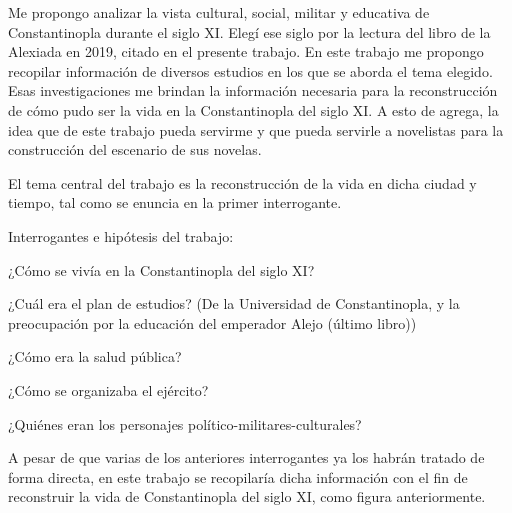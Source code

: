 


Me propongo analizar la vista cultural, social, militar y educativa de
Constantinopla durante el siglo XI. Elegí ese siglo por
la lectura del libro de la Alexiada en 2019, citado en el
presente trabajo.
En este trabajo me propongo recopilar información de diversos
estudios en los que se aborda el tema elegido.
Esas investigaciones me brindan la información necesaria para la
reconstrucción de cómo pudo ser la vida en la Constantinopla
del siglo XI. 
A esto de agrega, la idea que de este trabajo pueda servirme
y que pueda servirle a novelistas para la construcción del escenario
de sus novelas.

El tema central del trabajo es la reconstrucción de la vida
en dicha ciudad y tiempo, tal como se enuncia en la primer
interrogante.

Interrogantes e hipótesis del trabajo:

¿Cómo se vivía en la Constantinopla del siglo XI?

¿Cuál era el plan de estudios?
(De la Universidad de Constantinopla, y la preocupación
por la educación del emperador Alejo (último libro))

¿Cómo era la salud pública?

¿Cómo se organizaba el ejército?

¿Quiénes eran los personajes político-militares-culturales?

A pesar de que varias de los anteriores interrogantes ya los habrán 
tratado de forma directa, en este trabajo se recopilaría dicha 
información con el fin de reconstruir la vida de Constantinopla del 
siglo XI, como figura anteriormente.


